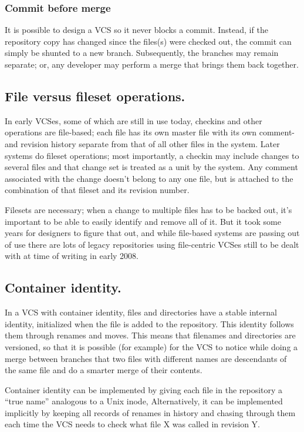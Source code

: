 \documentclass[twoside]{article}
\begin{document}
\begin{multicols}{2}
\subsubsection{Commit before merge}
It is possible to design a VCS so it never blocks a commit. Instead, if the repository copy has changed since the files(s) were checked out, the commit can simply be shunted to a new branch. Subsequently, the branches may remain separate; or, any developer may perform a merge that brings them back together.

\subsection{File versus fileset operations.}
In early VCSes, some of which are still in use today, checkins and other operations are file-based; each file has its own master file with its own comment- and revision history separate from that of all other files in the system. Later systems do fileset operations; most importantly, a checkin may include changes to several files and that change set is treated as a unit by the system. Any comment associated with the change doesn't belong to any one file, but is attached to the combination of that fileset and its revision number.

Filesets are necessary; when a change to multiple files has to be backed out, it's important to be able to easily identify and remove all of it. But it took some years for designers to figure that out, and while file-based systems are passing out of use there are lots of legacy repositories using file-centric VCSes still to be dealt with at time of writing in early 2008.

\subsection{Container identity.}
In a VCS with container identity, files and directories have a stable internal identity, initialized when the file is added to the repository. This identity follows them through renames and moves. This means that filenames and directories are versioned, so that it is possible (for example) for the VCS to notice while doing a merge between branches that two files with different names are descendants of the same file and do a smarter merge of their contents.

Container identity can be implemented by giving each file in the repository a “true name” analogous to a Unix inode, Alternatively, it can be implemented implicitly by keeping all records of renames in history and chasing through them each time the VCS needs to check what file X was called in revision Y.


\end{multicols}
\end{document}
